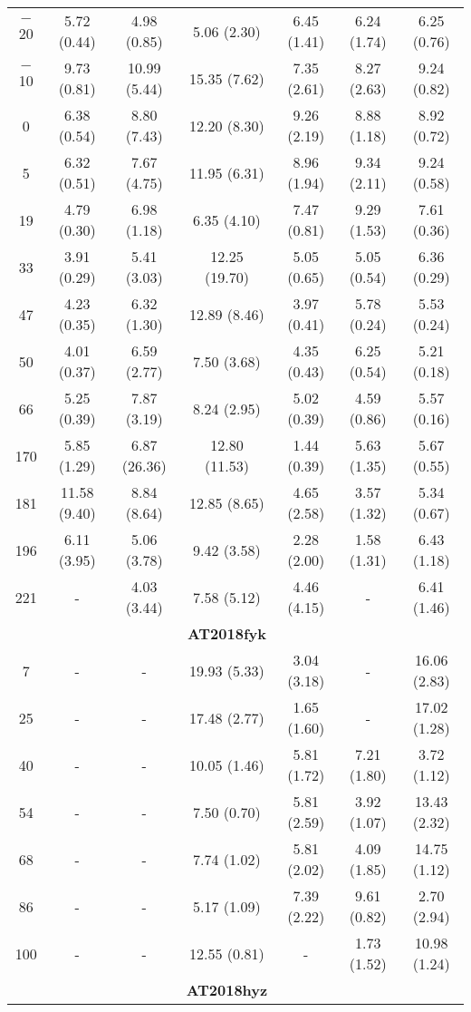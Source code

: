 \documentclass[structabstract]{aa}
\begin{document}
\begin{small}
\begin{longtable}{c c c c c c c}
$-$20	&	5.72 (0.44)	&	4.98 (0.85)	&	5.06 (2.30)	&	6.45 (1.41)	&	6.24 (1.74)	&	6.25 (0.76)  \\
$-$10	&	9.73 (0.81)	&	10.99 (5.44)	&	15.35 (7.62)	&	7.35 (2.61)	&	8.27 (2.63)	&	9.24 (0.82)  \\
0	&	6.38 (0.54)	&	8.80 (7.43)	&	12.20 (8.30)	&	9.26 (2.19)	&	8.88 (1.18)	&	8.92 (0.72)  \\
5	&	6.32 (0.51)	&	7.67 (4.75)	&	11.95 (6.31)	&	8.96 (1.94)	&	9.34 (2.11)	&	9.24 (0.58)  \\
19	&	4.79 (0.30)	&	6.98 (1.18)	&	6.35 (4.10)	&	7.47 (0.81)	&	9.29 (1.53)	&	7.61 (0.36)  \\
33	&	3.91 (0.29)	&	5.41 (3.03)	&	12.25 (19.70)	&	5.05 (0.65)	&	5.05 (0.54)	&	6.36 (0.29)  \\
47	&	4.23 (0.35)	&	6.32 (1.30)	&	12.89 (8.46)	&	3.97 (0.41)	&	5.78 (0.24)	&	5.53 (0.24)  \\
50	&	4.01 (0.37)	&	6.59 (2.77)	&	7.50 (3.68)	&	4.35 (0.43)	&	6.25 (0.54)	&	5.21 (0.18)  \\
66	&	5.25 (0.39)	&	7.87 (3.19)	&	8.24 (2.95)	&	5.02 (0.39)	&	4.59 (0.86)	&	5.57 (0.16)  \\
170	&	5.85 (1.29)	&	6.87 (26.36)	&	12.80 (11.53)	&	1.44 (0.39)	&	5.63 (1.35)	&	5.67 (0.55)  \\
181	&	11.58 (9.40)	&	8.84 (8.64)	&	12.85 (8.65)	&	4.65 (2.58)	&	3.57 (1.32)	&	5.34 (0.67)  \\
196	&	6.11 (3.95)	&	5.06 (3.78)	&	9.42 (3.58)	&	2.28 (2.00)	&	1.58 (1.31)	&	6.43 (1.18)  \\
221	&	-	&	4.03 (3.44)	&	7.58 (5.12)	&	4.46 (4.15)	&	-	&	6.41 (1.46)  \\ \hline
	&		&		&	\textbf{AT2018fyk}	&		&		&	\\ \hline
7	&	-	&	-	&	19.93 (5.33)	&	3.04 (3.18)	&	-	&	16.06 (2.83)  \\
25	&	-	&	-	&	17.48 (2.77)	&	1.65 (1.60)	&	-	&	17.02 (1.28)  \\
40	&	-	&	-	&	10.05 (1.46)	&	5.81 (1.72)	&	7.21 (1.80)	&	3.72 (1.12)  \\
54	&	-	&	-	&	7.50 (0.70)	&	5.81 (2.59)	&	3.92 (1.07)	&	13.43 (2.32)  \\
68	&	-	&	-	&	7.74 (1.02)	&	5.81 (2.02)	&	4.09 (1.85)	&	14.75 (1.12)  \\
86	&	-	&	-	&	5.17 (1.09)	&	7.39 (2.22)	&	9.61 (0.82)	&	2.70 (2.94)  \\
100	&	-	&	-	&	12.55 (0.81)	&	-	&	1.73 (1.52)	&	10.98 (1.24)  \\ \hline
	&		&		&	\textbf{AT2018hyz}	&		&		&	\\ \hline

\end{longtable}
\end{small}
\end{document}
